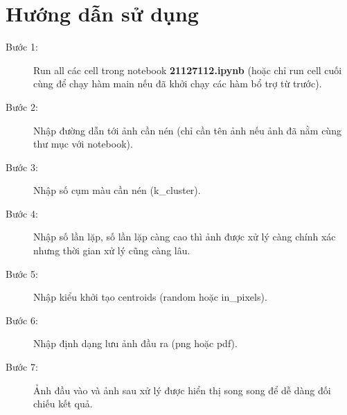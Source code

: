 \documentclass{article}
\begin{document}
\setlength{\parskip}{.5em}
\tableofcontents
\newpage

\setlength{\parskip}{.5em}
\newpage

\section{Hướng dẫn sử dụng}
\begin{description}
  \item[Bước 1:] Run all các cell trong notebook \textbf{21127112.ipynb} (hoặc chỉ run cell cuối cùng để chạy hàm main nếu đã khởi chạy các hàm bổ trợ từ trước).
  \item[Bước 2: ] Nhập đường dẫn tới ảnh cần nén (chỉ cần tên ảnh nếu ảnh đã nằm cùng thư mục với notebook).
  \item[Bước 3: ] Nhập số cụm màu cần nén (k\_cluster).
  \item[Bước 4: ] Nhập số lần lặp, số lần lặp càng cao thì ảnh được xử lý càng chính xác nhưng thời gian xử lý cũng càng lâu.
  \item[Bước 5: ] Nhập kiểu khởi tạo centroids (random hoặc in\_pixels).
  \item[Bước 6: ] Nhập định dạng lưu ảnh đầu ra (png hoặc pdf).
  \item[Bước 7: ] Ảnh đầu vào và ảnh sau xử lý được hiển thị song song để dễ dàng đối chiếu kết quả.
\end{description}
\end{document}
